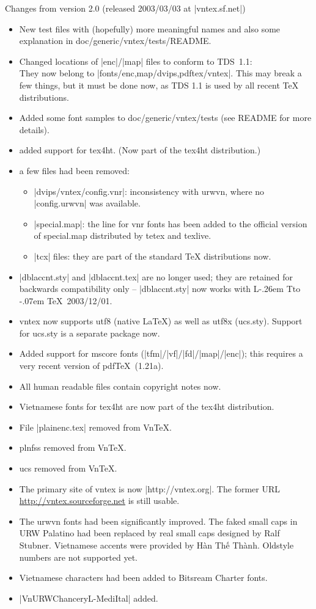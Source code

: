 \documentclass[a4paper,11pt]{article}
\makeatletter
\def\pkg#1{{\sffamily#1}}
\DeclareRobustCommand{\LaTeX}{L\kern-.26em%
  {\sbox\z@ T\vbox to\ht\z@{\hbox{\check@mathfonts
   \fontsize\sf@size\z@\math@fontsfalse\selectfont{}A}\vss}}%
   \kern-.07em%
   \TeX}\makeatother
\makeatother
\begin{document}
\begin{releasenotes}
Changes from version 2.0 (released 2003/03/03 at |vntex.sf.net|)
\begin{itemize}
\item New test files with (hopefully) more meaningful names and also some
  explanation in doc/generic/vntex/tests/README.
\item Changed locations of |enc|/|map| files to conform to TDS~1.1:\\
  They now belong to |fonts/{enc,map}/{dvips,pdftex}/vntex|.  This may
  break a few things, but it must be done now, as TDS 1.1 is used by
  all recent TeX distributions.
\item Added some font samples to doc/generic/vntex/tests (see README
  for more details).
\item added support for \pkg{tex4ht}. (Now part of the \pkg{tex4ht}
  distribution.)
\item a few files had been removed:
  \begin{itemize}
  \item |dvips/vntex/config.vnr|: inconsistency with \pkg{urwvn},
    where no |config.urwvn| was available.
  \item |special.map|: the line for vnr fonts has been added to the
    official version of special.map distributed by tetex and texlive.
  \item |tcx| files: they are part of the standard TeX distributions
    now.
  \end{itemize}
\item |dblaccnt.sty| and |dblaccnt.tex| are no longer used; they are
  retained for backwards compatibility only -- |dblaccnt.sty| now
  works with \LaTeX~2003/12/01.
\item vntex now supports utf8 (native LaTeX) as well as utf8x (ucs.sty).
  Support for ucs.sty is a separate package now.
\item Added support for \pkg{mscore} fonts
  (|tfm|/|vf|/|fd|/|map|/|enc|); this requires a very recent version
  of pdf\TeX~(1.21a).
\item All human readable files contain copyright notes now.
\item Vietnamese fonts for \pkg{tex4ht} are now part of the
  \pkg{tex4ht} distribution. 
\item File |plainenc.tex| removed from Vn\TeX.
\item \pkg{plnfss} removed from Vn\TeX.
\item \pkg{ucs} removed from Vn\TeX.
\item The primary site of vntex is now |http://vntex.org|.  The
  former URL \url{http://vntex.sourceforge.net} is still usable.
\item The urwvn fonts had been significantly improved.  The faked
  small caps in URW Palatino had been replaced by real small caps
  designed by Ralf Stubner.  Vietnamese accents were provided by
  Hàn Thế Thành.  Oldstyle numbers are not supported yet.
\item Vietnamese characters had been added to Bitsream Charter fonts.
\item |VnURWChanceryL-MediItal| added.
\end{itemize}

\end{releasenotes}
\end{document}

